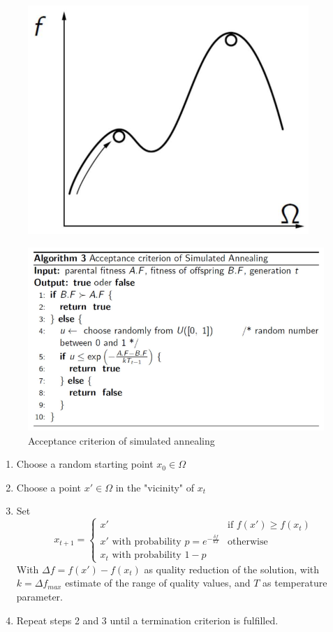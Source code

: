 \documentclass{article}
\begin{document}
\begin{figure}[H]
    \centering
    \includegraphics[scale=0.5]{images/sim_annealing.png}
\end{figure}
\begin{figure}[H]
    \centering
    \includegraphics[scale=0.5]{images/sim_annealing_algo.png}
    \caption{Acceptance criterion of simulated annealing}
\end{figure}
\begin{enumerate}
    \item Choose a random starting point $x_0\in\Omega$
    \item Choose a point $x'\in\Omega$ in the "vicinity" of $x_t$
    \item Set
          \[
              x_{t+1}=
              \begin{cases}
                  x'                                                    & \text{if }f(x')\geq f(x_t) \\
                  x'\text{ with probability }p=e^{-\frac{\delta f}{kT}} & \text{otherwise}           \\
                  x_t\text{ with probability }1-p
              \end{cases}
          \]
          With $\Delta f=f(x')-f(x_t)$ as quality reduction of the solution, with $k=\Delta f_{max}$
          estimate of the range of quality values, and $T$ as temperature parameter.
    \item Repeat steps 2 and 3 until a termination criterion is fulfilled.
\end{enumerate}
\end{document}
